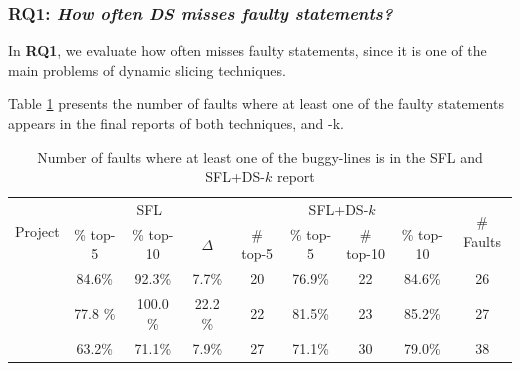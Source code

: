 \documentclass{article}
\begin{document}
\subsubsection{RQ1: \textit{How often DS misses faulty statements?}}

In \textbf{RQ1}, we evaluate how often \ds{} misses faulty statements, since it is one of the main problems of dynamic slicing techniques. 

Table \ref{table:fsws} presents the number of faults where at least one of the faulty statements appears in the final reports of both techniques, \sfl{} and \comb{}-k.


\begin{table}[h]
	\centering
	  \begin{tabular}{|l|ccc|cccc|c|}
		\toprule
		\multirow{2}{*}{Project}            & \multicolumn{3}{c|}{SFL}  & \multicolumn{4}{c|}{SFL+DS-$k$} & \multirow{2}{*}{\# Faults} \\ 

		            & \% top-5 & \% top-10  & $\Delta$ & \# top-5 & \% top-5 & \# top-10 & \% top-10 &  \\ 
		\midrule
		\chart{}           & 84.6\%  & 92.3\% & 7.7\%  & 20 & 76.9\% & 22 & 84.6\% & 26    \\  %
		\jtime{}           & 77.8 \%  & 100.0 \% & 22.2 \%  & 22 & 81.5\% & 23 & 85.2\% & 27     \\   %
		 \mockito{}         & 63.2\%  & 71.1\% & 7.9\%   & 27 & 71.1\% & 30 & 79.0\% & 38 \\     %
		\bottomrule
	\end{tabular}
  \caption {Number of faults where at least one of the buggy-lines is in the SFL and SFL+DS-$k$ report }
  \label{table:fsws}
\end{table}  
\end{document}
